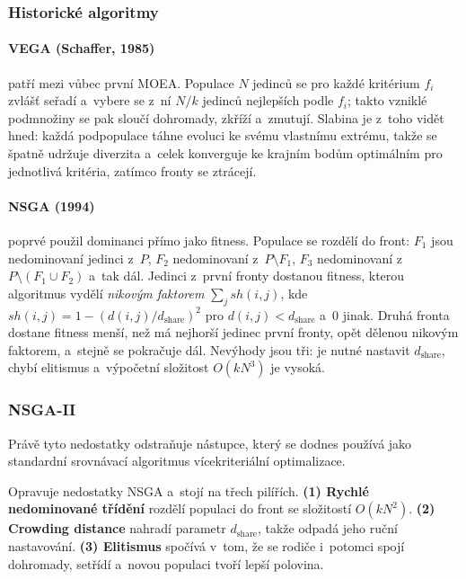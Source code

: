 \documentclass[11pt,a4paper]{article}
\theoremstyle{definition}
\begin{document}
\subsubsection{Historické algoritmy}

\paragraph{VEGA (Schaffer, 1985)} patří mezi vůbec první MOEA. Populace $N$ jedinců se
pro každé kritérium $f_i$ zvlášť seřadí a~vybere se z~ní $N/k$ jedinců nejlepších podle
$f_i$; takto vzniklé podmnožiny se pak sloučí dohromady, zkříží a~zmutují. Slabina je
z~toho vidět hned: každá podpopulace táhne evoluci ke svému vlastnímu extrému, takže se
špatně udržuje diverzita a~celek konverguje ke krajním bodům optimálním pro jednotlivá
kritéria, zatímco  fronty se ztrácejí.

\paragraph{NSGA (1994)} poprvé použil dominanci přímo jako fitness. Populace se rozdělí
do front: $F_1$ jsou nedominovaní jedinci z~$P$, $F_2$ nedominovaní z~$P \setminus F_1$,
$F_3$ nedominovaní z~$P \setminus (F_1 \cup F_2)$ a~tak dál. Jedinci z~první fronty
dostanou  fitness, kterou algoritmus vydělí \emph{nikovým faktorem}
$\sum_j sh(i,j)$, kde
$sh(i,j) = 1 - (d(i,j)/d_{\mathrm{share}})^2$ pro $d(i,j) < d_{\mathrm{share}}$
a~0 jinak. Druhá fronta dostane fitness menší, než má nejhorší jedinec první fronty,
opět dělenou nikovým faktorem, a~stejně se pokračuje dál. Nevýhody jsou tři: je nutné
nastavit $d_{\mathrm{share}}$, chybí elitismus a~výpočetní složitost $O(kN^3)$ je vysoká.

\subsubsection{NSGA-II}

Právě tyto nedostatky odstraňuje nástupce, který se dodnes používá jako standardní
srovnávací algoritmus vícekriteriální optimalizace.

\begin{defbox}
Opravuje nedostatky NSGA a~stojí na třech pilířích.
\textbf{(1) Rychlé nedominované třídění} rozdělí populaci do front se složitostí
$O(kN^2)$.
\textbf{(2) Crowding distance} nahradí parametr $d_{\mathrm{share}}$, takže odpadá jeho
ruční nastavování.
\textbf{(3) Elitismus} spočívá v~tom, že se rodiče i~potomci spojí dohromady, setřídí
a~novou populaci tvoří lepší polovina.
\end{defbox}
\end{document}
